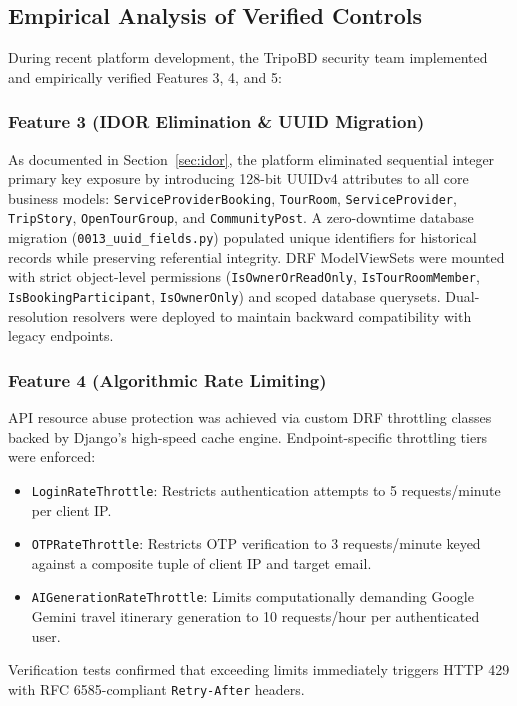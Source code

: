 \documentclass[10pt,twocolumn,a4paper]{article}
\begin{document}
\subsection{Empirical Analysis of Verified Controls}
During recent platform development, the TripoBD security team implemented and empirically verified Features 3, 4, and 5:

\subsubsection{Feature 3 (IDOR Elimination \& UUID Migration)}
As documented in Section~\ref{sec:idor}, the platform eliminated sequential integer primary key exposure by introducing 128-bit UUIDv4 attributes to all core business models: \texttt{ServiceProviderBooking}, \texttt{TourRoom}, \texttt{ServiceProvider}, \texttt{TripStory}, \texttt{OpenTourGroup}, and \texttt{CommunityPost}. A zero-downtime database migration (\texttt{0013\_uuid\_fields.py}) populated unique identifiers for historical records while preserving referential integrity. DRF ModelViewSets were mounted with strict object-level permissions (\texttt{IsOwnerOrReadOnly}, \texttt{IsTourRoomMember}, \texttt{IsBookingParticipant}, \texttt{IsOwnerOnly}) and scoped database querysets. Dual-resolution resolvers were deployed to maintain backward compatibility with legacy endpoints.

\subsubsection{Feature 4 (Algorithmic Rate Limiting)}
API resource abuse protection was achieved via custom DRF throttling classes backed by Django's high-speed cache engine. Endpoint-specific throttling tiers were enforced:
\begin{itemize}[leftmargin=*]
    \item \texttt{LoginRateThrottle}: Restricts authentication attempts to 5 requests/minute per client IP.
    \item \texttt{OTPRateThrottle}: Restricts OTP verification to 3 requests/minute keyed against a composite tuple of client IP and target email.
    \item \texttt{AIGenerationRateThrottle}: Limits computationally demanding Google Gemini travel itinerary generation to 10 requests/hour per authenticated user.
\end{itemize}
Verification tests confirmed that exceeding limits immediately triggers HTTP 429 with RFC 6585-compliant \texttt{Retry-After} headers.
\end{document}
